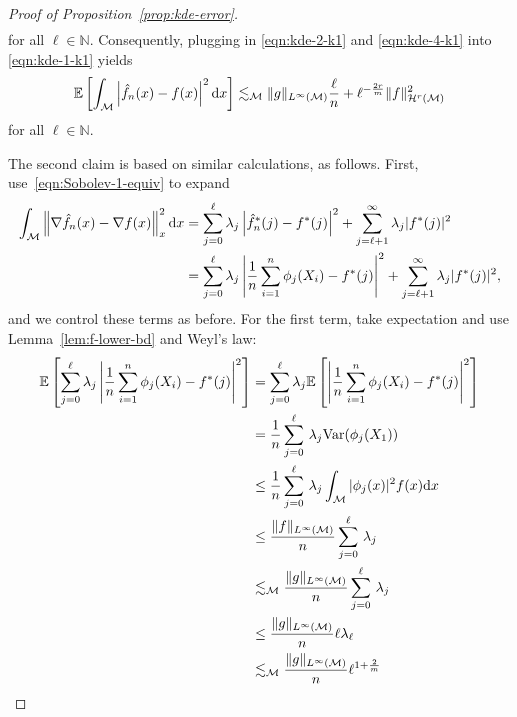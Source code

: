 \documentclass[preprint]{imsart}
\theoremstyle{plain}
\theoremstyle{definition}
\newcommand{\Nbb}{\mathbb{N}}
\newcommand{\Ebb}{\mathbb{E}}
\newcommand{\Var}{\textnormal{Var}}
\newcommand{\Mcal}{\mathcal{M}}
\newcommand{\Hcal}{\mathcal{H}}
\newcommand{\diff}{\textnormal{d}}
\begin{document}
\begin{appendix}
\begin{proof}[Proof of Proposition~\ref{prop:kde-error}]
\begin{equation}
\begin{split}
        \end{split}
    \end{equation}
    for all $\ell\in\Nbb$.
    Consequently, plugging in \eqref{eqn:kde-2-k1} and \eqref{eqn:kde-4-k1} into \eqref{eqn:kde-1-k1} yields
    \begin{equation}\label{eqn:kde-k1}
        \Ebb\left[\int_{\Mcal}\left|\hat{f}_n(x)-f(x)\right|^2\diff x\right] \lesssim_{\Mcal} \|g\|_{L^\infty(\Mcal)}\frac{\ell}{n} + \ell^{-\frac{2r}{m}}\|f\|_{\Hcal^r(\Mcal)}^2 
    \end{equation}
    for all $\ell\in\Nbb$.

    The second claim is based on similar calculations, as follows.
    First, use~\eqref{eqn:Sobolev-1-equiv} to expand
    \begin{equation}\label{eqn:kde-1-k2}
        \begin{split}
            \int_{\Mcal}\left\|\nabla\hat{f}_n(x)-\nabla f(x)\right\|_x^2\diff x &= \sum_{j=0}^{\ell}\lambda_j\left|\hat{f}_n^{\ast}(j)-f^{\ast}(j)\right|^2+\sum_{j=\ell+1}^{\infty}\lambda_j|f^{\ast}(j)|^2 \\
            &= \sum_{j=0}^{\ell}\lambda_j\left|\frac{1}{n}\sum_{i=1}^{n}\phi_j(X_i)-f^{\ast}(j)\right|^2+\sum_{j= \ell+1}^{\infty}\lambda_j|f^{\ast}(j)|^2,
        \end{split}
    \end{equation}
    and we control these terms as before.
    For the first term, take expectation and use Lemma~\ref{lem:f-lower-bd} and Weyl's law:
    \begin{equation}\label{eqn:kde-4-k2}
        \begin{split}
        \Ebb\left[\sum_{j=0}^{ \ell}\lambda_j\left|\frac{1}{n}\sum_{i=1}^{n}\phi_j(X_i)-f^{\ast}(j)\right|^2\right] &= \sum_{j=0}^{\ell}\lambda_j\Ebb\left[\left|\frac{1}{n}\sum_{i=1}^{n}\phi_j(X_i)-f^{\ast}(j)\right|^2\right] \\
        &= \frac{1}{n}\sum_{j=0}^{\ell}\,\lambda_j\Var(\phi_j(X_1))\\
        &\le \frac{1}{n}\sum_{j=0}^{\ell}\,\lambda_j\int_{\Mcal}|\phi_j(x)|^2f(x)\diff x \\
        &\le \frac{\|f\|_{L^\infty(\Mcal)}}{n}\sum_{j=0}^{\ell}\,\lambda_j \\
        &\lesssim_{\Mcal} \frac{\|g\|_{L^\infty(\Mcal)}}{n}\sum_{j=0}^{\ell}\,\lambda_j \\
        &\le\frac{\|g\|_{L^\infty(\Mcal)}}{n}\ell\lambda_{\ell} \\
        &\lesssim_{\Mcal}\frac{\|g\|_{L^\infty(\Mcal)}}{n}\ell^{1+\frac{2}{m}} \\

\end{split}
\end{equation}
\end{proof}
\end{appendix}
\end{document}
